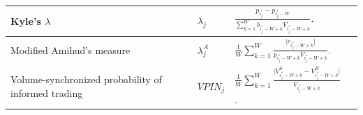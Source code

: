 \documentclass[10pt,a4paper,oneside]{article}
\begin{document}
\begin{longtable}{|p{4cm}|p{2.25cm}|p{5.25cm}|p{2.25cm}|}
    Kyle's $\lambda$                                                                                                                                                       &
    $\lambda_j$                                                                                                                                                            &
    $\frac{p_{i^*_j} - p_{i^*_j - W}}{\sum^W_{k = 1} b_{i^*_j - W + k} V_{i^*_j - W + k}}$.                                                                                &
    \cite{Kyle1985, easley2021microstructure}                                                                                                                                                                                                                                                                                                                                                  \\ \hline

    Modified Amihud's measure                                                                                                                                              &
    $\lambda^A_j$                                                                                                                                                          &
    $\frac{1}{W} \sum^W_{k = 1} \frac{\big| r_{i^*_j - W + k} \big|}{p_{i^*_j - W + k} V_{i^*_j - W + k}}$.                                                                &
    \cite{barardehi2018trade, easley2021microstructure}                                                                                                                                                                                                                                                                                                                                        \\ \hline

    Volume-synchronized probability of informed trading                                                                                                                    &
    $VPIN_j$                                                                                                                                                               &
    $\frac{1}{W} \sum^W_{k = 1} \frac{\big| V_{i^*_j - W + k}^S - V^B_{i^*_j - W + k} \big|}{V_{i^*_j - W + k}}$.                                                          &
    \cite{EASLEY2016269, easley2021microstructure}                                                                                                                                                                                                                                                                                                                                             \\ \hline


\end{longtable}
\end{document}
